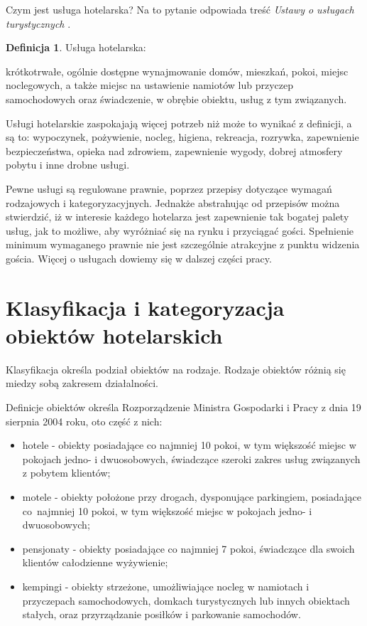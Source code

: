 \documentclass[a4paper,onecolumn,oneside,11pt,wide,floatssmall]{mwrep}
\theoremstyle{definition}
\newtheorem{defn}{Definicja}[section]
\theoremstyle{plain}%
\theoremstyle{remark}
\begin{document}
Czym jest usługa hotelarska? Na to pytanie odpowiada treść \textit{Ustawy o usługach 
turystycznych} \cite{ust:tur}.

\begin{defn}{Usługa hotelarska:}

krótkotrwałe, ogólnie dostępne wynajmowanie domów, mieszkań, pokoi, miejsc 
noclegowych, a także miejsc na ustawienie namiotów lub przyczep 
samochodowych oraz świadczenie, w obrębie obiektu, usług z tym związanych.

\end{defn}

Usługi hotelarskie zaspokajają więcej potrzeb niż może to wynikać z 
definicji, a są to: wypoczynek, pożywienie, nocleg, higiena, rekreacja, 
rozrywka, zapewnienie bezpieczeństwa, opieka nad zdrowiem, zapewnienie 
wygody, dobrej atmosfery pobytu i inne drobne usługi.

Pewne usługi są regulowane prawnie, poprzez przepisy dotyczące wymagań 
rodzajowych i kategoryzacyjnych. Jednakże abstrahując od przepisów można 
stwierdzić, iż w interesie każdego hotelarza jest zapewnienie tak bogatej 
palety usług, jak to możliwe, aby wyróżniać się na rynku i przyciągać gości. 
Spełnienie minimum wymaganego prawnie nie jest szczególnie atrakcyjne z 
punktu widzenia gościa. Więcej o usługach dowiemy się w dalszej części pracy.

\section{Klasyfikacja i kategoryzacja obiektów hotelarskich}
Klasyfikacja określa podział obiektów na rodzaje. Rodzaje obiektów różnią 
się miedzy sobą zakresem działalności.

Definicje obiektów określa Rozporządzenie Ministra Gospodarki i Pracy z dnia 
19 sierpnia 2004 roku, oto część z nich:

\begin{itemize}
  \item hotele - obiekty posiadające co najmniej 10 pokoi, w tym większość 
  miejsc w pokojach jedno- i dwuosobowych, świadczące szeroki zakres usług 
  związanych z pobytem klientów;
  \item motele - obiekty położone przy drogach, dysponujące parkingiem, 
  posiadające \mbox{co najmniej} 10 pokoi, w tym większość miejsc w pokojach jedno- 
  i dwuosobowych;
  \item pensjonaty - obiekty posiadające co najmniej 7 pokoi, świadczące dla 
  swoich klientów całodzienne wyżywienie;
  \item kempingi - obiekty strzeżone, umożliwiające nocleg w namiotach i 
  przyczepach samochodowych, domkach turystycznych lub innych obiektach 
  stałych, oraz przyrządzanie posiłków i parkowanie samochodów.
\end{itemize}
\end{document}
